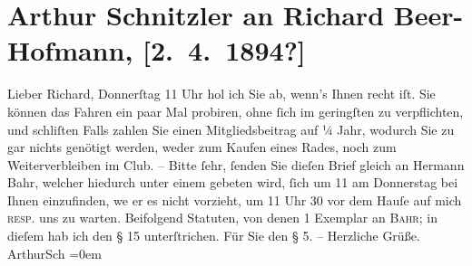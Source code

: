 

         
         \renewcommand{\erwaehntePersonen}{Personen: Hermann Bahr, Richard Beer-Hofmann}
         \renewcommand{\erwaehnteInstitutionen}{Institutionen: Vorwärts}
         \renewcommand{\erwaehnteOrte}{Orte: Untere Augartenstraße, Wien}
         \renewcommand{\erwaehnteWerke}{}
               \section[Arthur Schnitzler an Richard Beer-Hofmann, {[}2. 4. 1894?{]}]{ Arthur Schnitzler an Richard Beer-Hofmann, {[}2. 4. 1894?{]}}\nopagebreak{}\rehead{ }\begin{ledgroupsized}[t]{13cm}\normalsize\beginnumbering \toendnotes[C]{\smallbreak\pagebreak[2]} 
\toendnotes[C]{\smallbreak}\pstart{}{\pb}Lieber Richard,\pend\pstart
           Donnerſtag 11 Uhr hol ich Sie ab, wenn’s Ihnen recht iſt. Sie können das Fahren
                    ein paar Mal probiren, ohne ſich im geringſten zu verpflichten, und schli{\geminationm}ſten Falls zahlen Sie einen Mit{\pb}gliedsbeitrag auf ¼ Jahr, wodurch Sie zu
                         gar nichts genötigt werden, weder zum
                    Kaufen eines Rades, noch zum Weiterverbleiben im Club. –\pend
           \pstart
           Bitte ſehr, ſenden Sie dieſen Brief gleich {\pb}an Hermann Bahr, welcher hiedurch unter
                    einem gebeten wird, ſich um 11 am Donnerstag bei Ihnen einzufinden, we{\geminationn} er es nicht vorzieht, um 11 Uhr 30
                    vor dem Hauſe \label{K_L00309_1v}\label{K_L00309_1h} auf mich \textsc{resp}. uns zu warten.\pend
           \pstart
           {\pb}Beifolgend Statuten, von denen 1 Exemplar an
                        \textsc{Bahr}; in dieſem hab ich den § 15 unterſtrichen. Für Sie den § 5. –\pend
           \pstart
           Herzliche Grüße.{\\[\baselineskip]}\spacefill\mbox{ArthurSch}\pend
           \leftskip=0em{}
         

\end{ledgroupsized}
